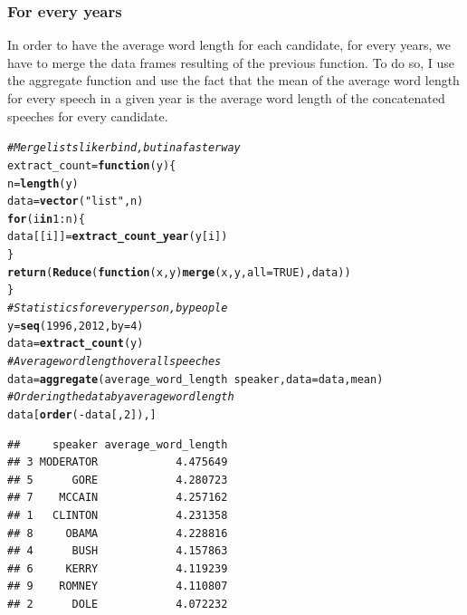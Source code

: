 \documentclass{llncs}\usepackage[]{graphicx}\usepackage[]{color}
\makeatletter
\newcommand{\hlnum}[1]{\textcolor[rgb]{0.686,0.059,0.569}{#1}}%
\newcommand{\hlstr}[1]{\textcolor[rgb]{0.192,0.494,0.8}{#1}}%
\newcommand{\hlcom}[1]{\textcolor[rgb]{0.678,0.584,0.686}{\textit{#1}}}%
\newcommand{\hlopt}[1]{\textcolor[rgb]{0,0,0}{#1}}%
\newcommand{\hlstd}[1]{\textcolor[rgb]{0.345,0.345,0.345}{#1}}%
\newcommand{\hlkwa}[1]{\textcolor[rgb]{0.161,0.373,0.58}{\textbf{#1}}}%
\newcommand{\hlkwb}[1]{\textcolor[rgb]{0.69,0.353,0.396}{#1}}%
\newcommand{\hlkwc}[1]{\textcolor[rgb]{0.333,0.667,0.333}{#1}}%
\newcommand{\hlkwd}[1]{\textcolor[rgb]{0.737,0.353,0.396}{\textbf{#1}}}%
\newenvironment{kframe}{%
 \def\at@end@of@kframe{}%
 \ifinner\ifhmode%
  \def\at@end@of@kframe{\end{minipage}}%
  \begin{minipage}{\columnwidth}%
 \fi\fi%
 \def\FrameCommand##1{\hskip\@totalleftmargin \hskip-\fboxsep
 \colorbox{shadecolor}{##1}\hskip-\fboxsep
     \hskip-\linewidth \hskip-\@totalleftmargin \hskip\columnwidth}%
 \MakeFramed {\advance\hsize-\width
   \@totalleftmargin\z@ \linewidth\hsize
   \@setminipage}}%
 {\par\unskip\endMakeFramed%
 \at@end@of@kframe}
\newenvironment{knitrout}{}{} %
\makeatother
\begin{document}
\subsubsection{For every years}
In order to have the average word length for each candidate, for every years, we have to merge the data frames resulting of the previous function. To do so, I use the aggregate function and use the fact that the mean of the average word length for every speech in a given year is the average word length of the concatenated speeches for every candidate.
\begin{knitrout}
\color{fgcolor}\begin{kframe}
\begin{alltt}
\hlcom{#Merge lists like rbind, but in a faster way}
\hlstd{extract_count} \hlkwb{=} \hlkwa{function}\hlstd{(}\hlkwc{y}\hlstd{)\{}
  \hlstd{n}\hlkwb{=}\hlkwd{length}\hlstd{(y)}
  \hlstd{data}\hlkwb{=}\hlkwd{vector}\hlstd{(}\hlstr{"list"}\hlstd{, n)}
  \hlkwa{for} \hlstd{(i} \hlkwa{in} \hlnum{1}\hlopt{:}\hlstd{n)\{}
    \hlstd{data[[i]]}\hlkwb{=}\hlkwd{extract_count_year}\hlstd{(y[i])}
  \hlstd{\}}
  \hlkwd{return}\hlstd{(}\hlkwd{Reduce}\hlstd{(}\hlkwa{function}\hlstd{(}\hlkwc{x}\hlstd{,} \hlkwc{y}\hlstd{)} \hlkwd{merge}\hlstd{(x, y,} \hlkwc{all}\hlstd{=}\hlnum{TRUE}\hlstd{), data))}
\hlstd{\}}
\hlcom{#Statistics for every person, by people}
\hlstd{y}\hlkwb{=}\hlkwd{seq}\hlstd{(}\hlnum{1996}\hlstd{,}\hlnum{2012}\hlstd{,}\hlkwc{by}\hlstd{=}\hlnum{4}\hlstd{)}
\hlstd{data}\hlkwb{=}\hlkwd{extract_count}\hlstd{(y)}
\hlcom{#Average word length over all speeches}
\hlstd{data}\hlkwb{=}\hlkwd{aggregate}\hlstd{(average_word_length} \hlopt{~} \hlstd{speaker,} \hlkwc{data} \hlstd{= data, mean)}
\hlcom{#Ordering the data by average word length}
\hlstd{data[}\hlkwd{order}\hlstd{(}\hlopt{-}\hlstd{data[,}\hlnum{2}\hlstd{]),]}
\end{alltt}
\begin{lstlisting}[basicstyle=\ttfamily,breaklines=true]
##     speaker average_word_length
## 3 MODERATOR            4.475649
## 5      GORE            4.280723
## 7    MCCAIN            4.257162
## 1   CLINTON            4.231358
## 8     OBAMA            4.228816
## 4      BUSH            4.157863
## 6     KERRY            4.119239
## 9    ROMNEY            4.110807
## 2      DOLE            4.072232
\end{lstlisting}
\end{kframe}
\end{knitrout}
\end{document}
